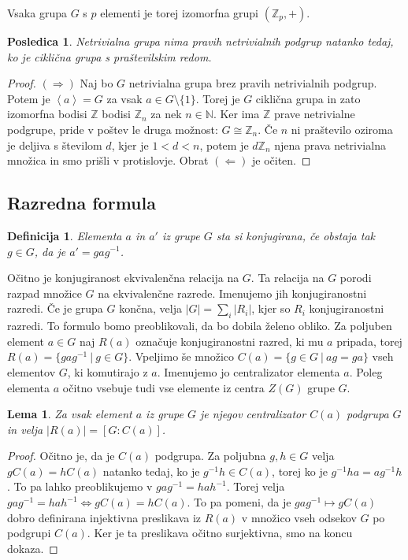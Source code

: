 \documentclass[10pt, a4paper]{article}
\newtheorem{posledica}[izr]{Posledica}
\newtheorem{defi}{Definicija}[section]
\newenvironment{noticeB}{%
  \tcolorbox[%
  notitle,
  empty,
  enhanced,  %
  breakable,
  coltext=black,
  colback=white, 
  fontupper=\rmfamily,
  parbox=false,
  noparskip,
  sharp corners,
  boxrule=-1pt,  %
  frame hidden,
  left=7pt,  %
  right=7pt,
  top=5pt,
  bottom=5pt,
  before skip=2.5ex plus 2pt,
  after skip=2.5ex plus 2pt,
  borderline west = {1.5pt}{-0.1pt}{blue!30!black}, %
  overlay unbroken and last={%
    \draw[color=black, line width=1.25pt]
    ($(frame.south west)+(1.pt, -0.1pt)$) -- ++(2em, 0);
  }
  ]}
{\endtcolorbox}
\newenvironment{definicija}{\begin{defi}\begin{noticeB}}{%
    \end{noticeB}\end{defi}}
\newtheorem{lema}[izr]{Lema}
\newenvironment{noticeC}{%
  \tcolorbox[%
  notitle,
  empty,
  enhanced,  %
  breakable,
  coltext=black, 
  fontupper=\rmfamily,
  parbox=false,
  noparskip,
  sharp corners,
  boxrule=-1pt,  %
  frame hidden,
  left=7pt,  %
  right=7pt,
  top=5pt,
  bottom=5pt,
  before skip=2.5ex plus 2pt,
  after skip=2.5ex plus 2pt,
  overlay unbroken and last={%
  },
  ]}
{\endtcolorbox}
\newenvironment{dokaz}%
  {\begin{noticeC}\begin{proof}}%
  {\end{proof}\end{noticeC}}
\newcommand{\N}{\mathbb {N}}
\newcommand{\Z}{\mathbb {Z}}
\newcommand{\gen}[1]{\left\langle #1 \right\rangle}
\begin{document}
Vsaka grupa $G$ s $p$ elementi je torej izomorfna grupi $(\Z_p, +)$.

\begin{posledica}
  Netrivialna grupa nima pravih netrivialnih podgrup natanko tedaj, ko je ciklična grupa s praštevilskim redom.
\end{posledica}

\begin{dokaz}
  $(\Rightarrow)$ Naj bo $G$ netrivialna grupa brez pravih netrivialnih podgrup.
  Potem je $\gen{a} = G$ za vsak $a \in G \setminus \{1\}$.
  Torej je $G$ ciklična grupa in zato izomorfna bodisi $\Z$ bodisi $\Z_n$ za nek $n \in \N$.
  Ker ima $\Z$ prave netrivialne podgrupe, pride v poštev le druga možnost: $G \cong \Z_n$.
  Če $n$ ni praštevilo oziroma je deljiva s številom $d$, kjer je $1 < d < n$, 
  potem je $d\Z_n$ njena prava netrivialna množica in smo prišli v protislovje.
  Obrat $(\Leftarrow)$ je očiten.
\end{dokaz}


\subsection{Razredna formula}

\begin{definicija}
  Elementa $a$ in $a'$ iz grupe $G$ sta si konjugirana,
  če obstaja tak $g \in G$, da je $a' = g ag^{-1}$.
\end{definicija}

Očitno je konjugiranost ekvivalenčna relacija na $G$.
Ta relacija na $G$ porodi razpad množice $G$ na ekvivalenčne razrede.
Imenujemo jih konjugiranostni razredi.
Če je grupa $G$ končna, velja $|G| = \sum_i |R_i|$,
kjer so $R_i$ konjugiranostni razredi.
To formulo bomo preoblikovali, da bo dobila želeno obliko.
Za poljuben element $a \in G$ naj $R(a)$ označuje konjugiranostni razred, ki mu $a$ pripada,
torej $R(a) = \{gag^{-1}\ |\ g \in G\}$.
Vpeljimo še množico $C(a) = \{g \in G\ |\ ag = ga\}$ vseh elementov $G$, ki komutirajo z $a$.
Imenujemo jo centralizator elementa $a$.
Poleg elementa $a$ očitno vsebuje tudi vse elemente iz centra $Z(G)$ grupe $G$.

\begin{lema}
  Za vsak element $a$ iz grupe $G$ je njegov centralizator $C(a)$ podgrupa $G$
  in velja $|R(a)| = [G: C(a)]$.
\end{lema}

\begin{dokaz}
  Očitno je, da je $C(a)$ podgrupa.
  Za poljubna $g, h \in G$ velja $gC(a) = hC(a)$ natanko tedaj, ko je 
  $g^{-1} h \in C(a)$, torej ko je $g^{-1} h a = a g^{-1} h$.
  To pa lahko preoblikujemo v $g ag^{-1} = h a h^{-1}$.
  Torej velja $gag^{-1} = h a h^{-1} \Leftrightarrow g C(a) = h C(a)$.
  To pa pomeni, da je $g a g^{-1} \mapsto gC(a)$ dobro definirana injektivna preslikava 
  iz $R(a)$ v množico vseh odsekov $G$ po podgrupi $C(a)$.
  Ker je ta preslikava očitno surjektivna, smo na koncu dokaza.
\end{dokaz}
\end{document}
